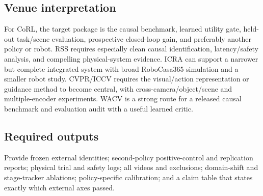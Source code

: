 

\subsection{Venue interpretation}

For CoRL, the target package is the causal benchmark, learned utility gate, held-out task/scene evaluation, prospective closed-loop gain, and preferably another policy or robot. RSS requires especially clean causal identification, latency/safety analysis, and compelling physical-system evidence. ICRA can support a narrower but complete integrated system with broad RoboCasa365 simulation and a smaller robot study. CVPR/ICCV requires the visual/action representation or guidance method to become central, with cross-camera/object/scene and multiple-encoder experiments. WACV is a strong route for a released causal benchmark and evaluation audit with a useful learned critic.

\subsection{Required outputs}

Provide frozen external identities; second-policy positive-control and replication reports; physical trial and safety logs; all videos and exclusions; domain-shift and stage-tracker ablations; policy-specific calibration; and a claim table that states exactly which external axes passed.
